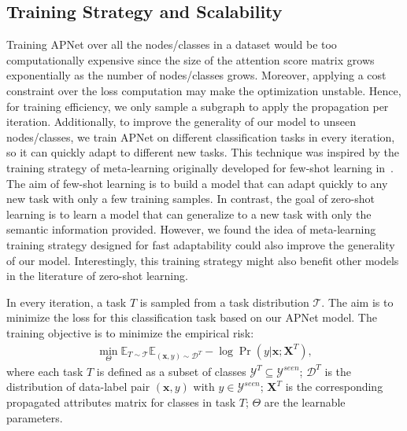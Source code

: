 \documentclass[letterpaper]{article}
\def\vx{{\bm{x}}}
\def\mX{{\bm{X}}}
\def\gD{{\mathcal{D}}}
\def\gT{{\mathcal{T}}}
\def\sE{{\mathbb{E}}}
\begin{document}
\subsection{Training Strategy and Scalability}
Training APNet over all the nodes/classes in a dataset would be too computationally expensive since the size of the attention score matrix grows exponentially as the number of nodes/classes grows. Moreover, applying a cost constraint over the loss computation may make the optimization unstable. Hence, for training efficiency, we only sample a subgraph to apply the propagation per iteration. Additionally, to improve the generality of our model to unseen nodes/classes, we train APNet on different classification tasks in every iteration, so it can quickly adapt to different new tasks. This technique was inspired by the training strategy of meta-learning originally developed for few-shot learning in~\cite{vinyals2016matching}. The aim of few-shot learning is to build a model that can adapt quickly to any new task with only a few training samples. In contrast, the goal of zero-shot learning is to learn a model that can generalize to a new task with only the semantic information provided. However, we found the idea of meta-learning training strategy designed for fast adaptability could also improve the generality of our model. Interestingly, this training strategy might also benefit other models in the literature of zero-shot learning.





In every iteration, a task $T$ is sampled from a task distribution $\gT$. The aim is to minimize the loss for this classification task based on our APNet model.
The training objective is to minimize the empirical risk:
\begin{align}\label{equ:opt-obj-all}
\min_\Theta{\sE}_{T\sim\gT}{\sE}_{(\vx, y)\sim\gD^{T}} -\log\Pr(y|\vx;\mX^{T}),
\end{align}
where each task $T$ is defined as a subset of classes $\mathcal Y^T\subseteq \mathcal Y^{seen}$; $\mathcal D^{T}$ is the distribution of data-label pair $(\vx,y)$ with $y\in \mathcal Y^{seen}$; $\mX^{T}$ is the corresponding propagated attributes matrix for classes in task $T$; $\Theta$ are the learnable parameters.
\end{document}
